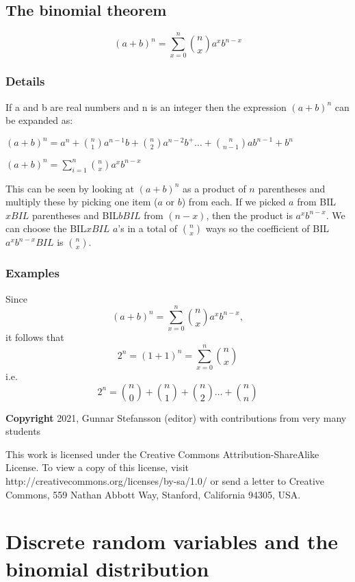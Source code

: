 \documentclass[12pt,a4paper]{article}
\theoremstyle{regla}
\theoremstyle{remark}
\theoremstyle{definition}
\theoremstyle{nonumberbreak}
\begin{document}
\subsection{The binomial theorem}
\begin{fbox}
\begin{minipage}{0.97\textwidth}
$$(a+b)^n  = \sum_{x=0}^n {n \choose x} a^xb^{n-x}$$
\end{minipage}
\end{fbox}
\subsubsection{Details}
If a and b are real numbers and n is an integer then the expression $(a+b)^n$  can be expanded as:

$ (a+b)^n = a^n+ {n \choose 1}a^{n-1}b +  {n \choose 2}a^{n-2}b^ + \ldots +{n \choose n-1}ab^{n-1}+b^n$  

$ (a+b)^n  = \sum_{i=1}^n  {n \choose x}a^xb^{n-x}$   

This can be seen by looking at $(a+b)^n$ as a product of $n$ parentheses
and multiply these by picking one item ($a$ or $b$) from each. If we picked
$a$ from BIL$xBIL$ parentheses and BIL$bBIL$ from $(n-x)$, then the product is
$a^x b^{n-x}$. We can choose the BIL$xBIL$ $a$'s in a total of $\binom{n}{x}$
ways so the coefficient of BIL$a^x b^{n-x}BIL$ is $\binom{n}{x}$.

\subsubsection{Examples}
\begin{xmpl}
Since
$$(a+b)^n  = \sum_{x=0}^n {n \choose x} a^xb^{n-x},$$
it follows that
$$2^n = (1+1)^n  = \sum_{x=0}^n {n \choose x}$$
i.e.
$$2^n = {n \choose 0} + {n \choose 1} + {n \choose 2}\ldots+ {n \choose n}$$

\end{xmpl}

{\bf Copyright}
2021, Gunnar Stefansson (editor) with contributions from very many students

This work is licensed under the Creative Commons
Attribution-ShareAlike License. To view a copy of this license, visit
http://creativecommons.org/licenses/by-sa/1.0/ or send a letter to
Creative Commons, 559 Nathan Abbott Way, Stanford, California 94305,
USA.
\clearpage
\section{Discrete random variables and the binomial distribution}
\end{document}
